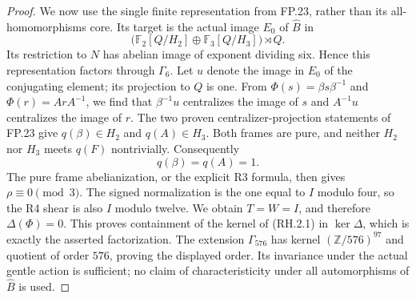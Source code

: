\begin{proof}
We now use the single finite representation from FP.23, rather
than its all-homomorphisms core.  Its target is the actual image
$E_0$ of $\widehat B$ in
\[
 \bigl(\mathbb F_2[Q/H_2]\oplus
             \mathbb F_3[Q/H_3]\bigr)\rtimes Q.
\]
Its restriction to $N$ has abelian image of exponent dividing
six. Hence this representation factors through $\Gamma_6$.
Let $u$ denote the image in $E_0$ of the conjugating element;
its projection to $Q$ is one.  From
$\Phi(s)=\beta s\beta^{-1}$ and $\Phi(r)=ArA^{-1}$,
we find that $\beta^{-1}u$ centralizes the image of $s$ and
$A^{-1}u$ centralizes the image of $r$.
The two proven centralizer-projection statements of FP.23 give
$q(\beta)\in H_2$ and $q(A)\in H_3$.
Both frames are pure, and neither $H_2$ nor $H_3$ meets $q(F)$
nontrivially. Consequently
\[
 q(\beta)=q(A)=1.
\]
The pure frame abelianization, or the explicit R3 formula,
then gives $\rho\equiv0\pmod3$. The signed normalization
is the one equal to $I$ modulo four, so the R4 shear is also
$I$ modulo twelve. We obtain $T=W=I$, and therefore
$\Delta(\Phi)=0$.
This proves containment of the kernel of (RH.2.1) in
$\ker\Delta$, which is exactly the asserted factorization.
The extension $\Gamma_{576}$ has kernel
$(\mathbb Z/576)^{97}$ and quotient of order $576$, proving
the displayed order.  Its invariance under the actual gentle
action is sufficient; no claim of characteristicity under
all automorphisms of $\widehat B$ is used.
\end{proof}

